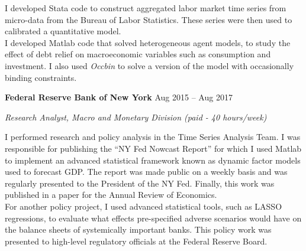 \documentclass[margin,line]{res}                          %
\def\tinyskip{\vspace\tinyskipamount}
\newenvironment{list1}{
	\begin{list}{\ding{113}}{%
			\setlength{\itemsep}{0in}
			\setlength{\parsep}{0in} \setlength{\parskip}{0in}
			\setlength{\topsep}{0in} \setlength{\partopsep}{0in}
			\setlength{\leftmargin}{0.17in}}}{\end{list}}
\begin{document}
\begin{resume}
\begin{list1}
		\item[] I developed Stata code to construct aggregated labor market time series from micro-data from the Bureau of Labor Statistics. These series were then used to calibrated a quantitative model.\\
		I developed Matlab code that solved heterogeneous agent models, to study the effect of debt relief on macroeconomic variables such as consumption and investment. I also used \textit{Occbin} to solve a version of the model with occasionally binding constraints.
		\medskip
		\item[] \textbf{Federal Reserve Bank of New York} \hfill Aug 2015 -- Aug 2017 \tinyskip
		\item[] \textit{{Research Analyst, Macro and Monetary Division} (paid - 40 hours/week)}\tinyskip
		\item[] I performed research and policy analysis in the Time Series Analysis Team. I was responsible for publishing the ``NY Fed Nowcast Report'' for which  I used Matlab to implement an advanced statistical framework known as dynamic factor models used to forecast GDP. The report was made public on a weekly basis and was regularly presented to the President of the NY Fed. Finally, this work was published in a paper for the Annual Review of Economics.\\
		For another policy project, I used advanced statistical tools, such as LASSO regressions, to evaluate what effects pre-specified adverse scenarios would have on the balance sheets of systemically important banks. This policy work was presented to high-level regulatory officials at the Federal Reserve Board.\smallskip
	\end{list1}
	

\end{resume}
\end{document}
